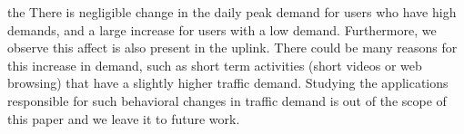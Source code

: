 the 
There is negligible change in the daily peak 
demand for users who have high demands, and a large increase for users with a low demand.
Furthermore, we observe this affect is also present in the uplink.
There could be many reasons for this increase in demand, such as short
term activities (short videos or web browsing) 
that have a slightly higher traffic demand. Studying the applications 
responsible for such behavioral changes in traffic demand is out of the
scope of this paper and we leave it to future work.